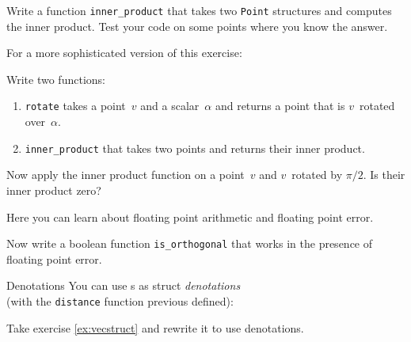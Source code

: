 \begin{comment}
  \begin{exercise}
    \label{ex:primestruct}
    If you are doing the prime project (chapter~\ref{ch:prime}) you can
    now do exercise~\ref{ex:prime:struct}.
  \end{exercise}
\end{comment}

\begin{exercise}
  \label{ex:vecstruct}
  Write a function \lstinline$inner_product$ that takes two \lstinline$Point$
  structures and computes the inner product. Test your code on some points where
  you know the answer.
\end{exercise}

For a more sophisticated version of this exercise:

\begin{exercise}
  \label{ex:vecortho}
  Write two functions:
  \begin{enumerate}
  \item \lstinline{rotate} takes a point~$v$ and a scalar~$\alpha$
    and returns a point that is $v$~rotated over~$\alpha$.
  \item \lstinline$inner_product$ that takes two points and returns
    their inner product.
  \end{enumerate}
  Now apply the inner product function on a point~$v$ and $v$~rotated
  by $\pi/2$. Is their inner product zero?

  Here you can learn about floating point arithmetic and floating point error.

  Now write a boolean function \lstinline{is_orthogonal}
  that works in the presence of floating point error.
\end{exercise}

\begin{block}{Denotations}
  \label{sl:struct-denote}
  You can use s as struct
  \emph{denotations}\\
  (with the \lstinline{distance} function previous defined):
\end{block}

\begin{exercise}
  \label{ex:struct-denote}
  Take exercise \ref{ex:vecstruct} and rewrite it to use denotations.
\end{exercise}

